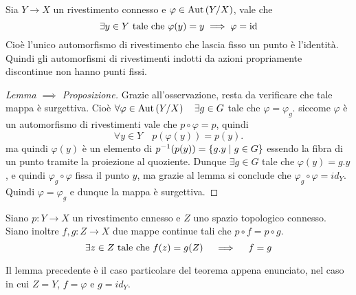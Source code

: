 \documentclass[]{article}
\begin{document}
\begin{lemma} \nl
    Sia $Y \to X$ un rivestimento connesso e $\varphi \in \mathrm{Aut}\left(Y/X\right)$, vale che
    \[
    \exists y \in Y \text{ tale che } \varphi(y) = y \implies \varphi = \mathrm{id}
    \]
    Cio\`e l'unico automorfismo di rivestimento che lascia fisso un punto \`e l'identit\`a. \nl
    Quindi gli automorfismi di rivestimenti indotti da azioni propriamente discontinue non hanno punti fissi.
\end{lemma}

\begin{proof} [Lemma $\implies$ Proposizione] \nl
    Grazie all'osservazione, resta da verificare che tale mappa \`e surgettiva. \nl
    Cio\`e $\forall \varphi \in \mathrm{Aut}\left(Y/X\right) \quad \exists g \in G$ tale che $\varphi = \varphi_g$. \nl
    siccome $\varphi$ \`e un automorfismo di rivestimenti vale che $p \circ\varphi = p$, quindi
    \[\forall y \in Y \quad p(\varphi(y)) = p(y).\]
    ma quindi $\varphi(y)$ \`e un elemento di $p^{-1}(p(y)) = \left\{ g.y \mid g \in G \right\}$ essendo la fibra di un punto tramite la proiezione al quoziente. \nl
    Dunque $\exists g \in G$ tale che $\varphi(y) = g.y$, e quindi $\varphi_g \circ \varphi$ fissa il punto $y$, ma grazie al lemma si conclude che $\varphi_g \circ \varphi = id_Y$. \nl
    Quindi $\varphi = \varphi_g$ e dunque la mappa \`e surgettiva.
\end{proof}

\begin{proposition}  \nl
    Siano $p: Y \to X$ un rivestimento cnnesso e $Z$ uno spazio topologico connesso. Siano inoltre 
    $f, g: Z \to X$ due mappe continue tali che $p \circ f = p \circ g$.
    \[\exists z \in Z \text{ tale che } f(z) = g(Z) \quad \implies \quad f = g\]
\end{proposition}

\begin{remark} \nl
    Il lemma precedente \`e il caso particolare del teorema appena enunciato, nel caso in cui $Z = Y$, $f = \varphi$ e $g = id_Y$.
\end{remark}
\end{document}
